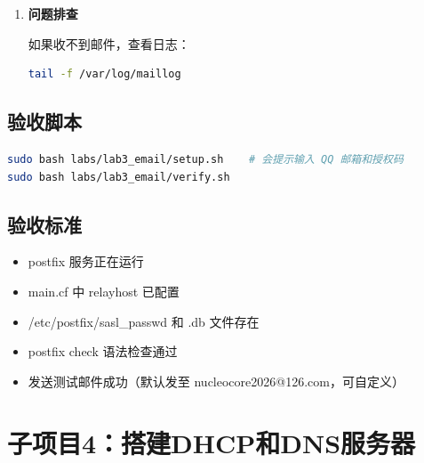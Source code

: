 \documentclass[12pt,a4paper]{ctexart}
\begin{document}
\begin{enumerate}[label=\arabic*.,leftmargin=*]
  \begin{cmdbox}
  \begin{lstlisting}[language=bash]
systemctl enable postfix
systemctl restart postfix
echo "Test mail from Rocky Linux" | mail -s "Test Subject" recipient@qq.com
  \end{lstlisting}
  \end{cmdbox}

  \item \textbf{问题排查}

  如果收不到邮件，查看日志：

  \begin{cmdbox}
  \begin{lstlisting}[language=bash]
tail -f /var/log/maillog
  \end{lstlisting}
  \end{cmdbox}

\end{enumerate}

\subsection{验收脚本}

\begin{cmdbox}
\begin{lstlisting}[language=bash]
sudo bash labs/lab3_email/setup.sh    # 会提示输入 QQ 邮箱和授权码
sudo bash labs/lab3_email/verify.sh
\end{lstlisting}
\end{cmdbox}

\subsection{验收标准}

\begin{itemize}
  \item postfix 服务正在运行
  \item main.cf 中 relayhost 已配置
  \item /etc/postfix/sasl\_passwd 和 .db 文件存在
  \item postfix check 语法检查通过
  \item 发送测试邮件成功（默认发至 nucleocore2026@126.com，可自定义）
\end{itemize}

\newpage
\section{子项目4：搭建DHCP和DNS服务器}
\end{document}
